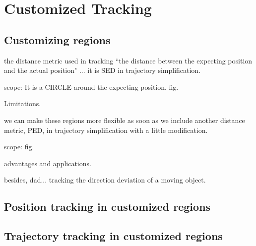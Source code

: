 

\section{Customized Tracking}
\label{sec:position}


\subsection{Customizing regions}

the distance metric used in tracking ``the distance between the expecting position and the actual position" ... it is SED in trajectory simplification. 

scope: It is  a CIRCLE around the expecting position. fig.

Limitations.

we can make these regions more flexible as soon as we include another distance metric, PED, in trajectory simplification with a little modification.

scope: fig.

advantages and applications.

besides, dad... tracking the direction deviation of a moving object.
 
\subsection{Position tracking in customized regions}




\subsection{Trajectory tracking in customized regions}



